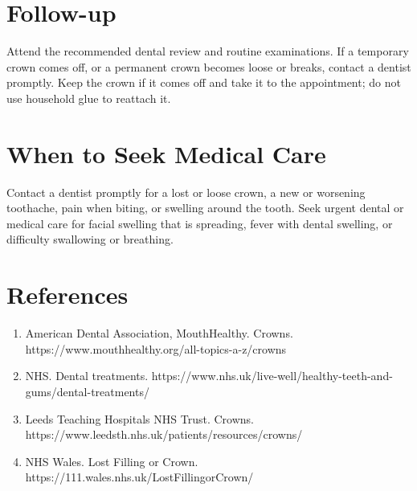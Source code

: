 \section*{Follow-up}
Attend the recommended dental review and routine examinations. If a temporary crown comes off, or a permanent crown becomes loose or breaks, contact a dentist promptly. Keep the crown if it comes off and take it to the appointment; do not use household glue to reattach it.

\section*{When to Seek Medical Care}
Contact a dentist promptly for a lost or loose crown, a new or worsening toothache, pain when biting, or swelling around the tooth. Seek urgent dental or medical care for facial swelling that is spreading, fever with dental swelling, or difficulty swallowing or breathing.

\section*{References}
\begin{enumerate}
  \item American Dental Association, MouthHealthy. Crowns. https://www.mouthhealthy.org/all-topics-a-z/crowns
  \item NHS. Dental treatments. https://www.nhs.uk/live-well/healthy-teeth-and-gums/dental-treatments/
  \item Leeds Teaching Hospitals NHS Trust. Crowns. https://www.leedsth.nhs.uk/patients/resources/crowns/
  \item NHS Wales. Lost Filling or Crown. https://111.wales.nhs.uk/LostFillingorCrown/
\end{enumerate}

\clearpage
